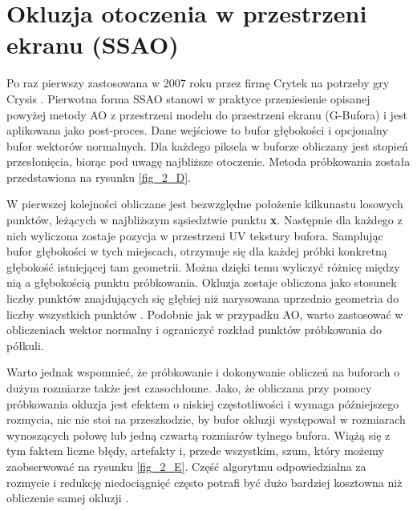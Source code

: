 	\section{Okluzja otoczenia w przestrzeni ekranu (SSAO)}
	\label{t:teoria:ssao}
	
	Po raz pierwszy zastosowana w 2007 roku przez firmę Crytek na potrzeby gry Crysis \cite{crytek}. Pierwotna forma SSAO stanowi w praktyce przeniesienie opisanej powyżej metody AO z przestrzeni modelu do przestrzeni ekranu (G-Bufora) i jest aplikowana jako post-proces. Dane wejściowe to bufor głębokości i opcjonalny bufor wektorów normalnych. Dla każdego piksela w buforze obliczany jest stopień przesłonięcia, biorąc pod uwagę najbliższe otoczenie. Metoda próbkowania została przedstawiona na rysunku \ref{fig_2_D}.
	
	
	W pierwszej kolejności obliczane jest bezwzględne położenie kilkunastu losowych punktów, leżących w najbliższym sąsiedztwie punktu \textbf{x}. Następnie dla każdego z nich wyliczona zostaje pozycja w przestrzeni UV tekstury bufora. Samplując bufor głębokości w tych miejscach, otrzymuje się dla każdej próbki konkretną głębokość istniejącej tam geometrii. Można dzięki temu wyliczyć różnicę między nią a głębokością punktu próbkowania. Okluzja zostaje obliczona jako stosunek liczby punktów znajdujących się głębiej niż narysowana uprzednio geometria do liczby wszystkich punktów \cite{luna}. Podobnie jak w przypadku AO, warto zastosować w obliczeniach wektor normalny i ograniczyć rozkład punktów próbkowania do półkuli.
	
	
	
	Warto jednak wspomnieć, że próbkowanie i dokonywanie obliczeń na buforach o dużym rozmiarze także jest czasochłonne. Jako, że obliczana przy pomocy próbkowania okluzja jest efektem o niskiej częstotliwości i wymaga późniejszego rozmycia, nic nie stoi na przeszkodzie, by bufor okluzji występował w rozmiarach wynoszących połowę lub jedną czwartą rozmiarów tylnego bufora. Wiążą się z tym faktem liczne błędy, artefakty i, przede wszystkim, szum, który możemy zaobserwować na rysunku \ref{fig_2_E}. Część algorytmu odpowiedzialna za rozmycie i redukcję niedociągnięć często potrafi być dużo bardziej kosztowna niż obliczenie samej okluzji \cite{statvo}.
	
